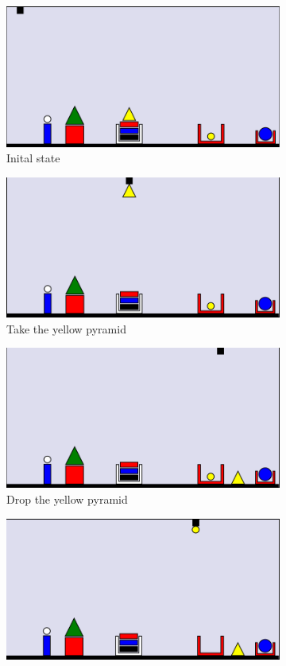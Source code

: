 \begin{figure}
\centering
\begin{subfigure}{.5\textwidth}
  \centering
  \includegraphics[width=.7\linewidth]{fig/1.png}
  \caption{Inital state}
  \label{fig:1}
\end{subfigure}%
\begin{subfigure}{.5\textwidth}
  \centering
  \includegraphics[width=.7\linewidth]{fig/2.png}
  \caption{Take the yellow pyramid}
  \label{fig:2}
\end{subfigure}
\begin{subfigure}{.5\textwidth}
  \centering
  \includegraphics[width=.7\linewidth]{fig/3.png}
  \caption{Drop the yellow pyramid}
  \label{fig:3}
\end{subfigure}%
\begin{subfigure}{.5\textwidth}
  \centering
  \includegraphics[width=.7\linewidth]{fig/4.png}

\end{subfigure}
\end{figure}
